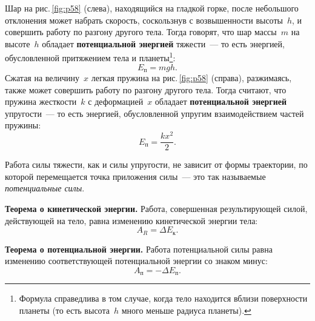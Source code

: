 \documentclass[main.tex]{subfiles}
\begin{document}
Шар на рис.\,\ref{fig:p58} (слева), находящийся на гладкой горке, после небольшого отклонения может набрать скорость, соскользнув с возвышенности высоты~$h$, и совершить работу по разгону другого тела. Тогда говорят, что шар массы~$m$ на высоте~$h$ обладает \textbf{потенциальной энергией} тяжести~--- то есть энергией, обусловленной притяжением тела и планеты\footnote{Формула справедлива в том случае, когда тело находится вблизи поверхности планеты (то есть высота~$h$ много меньше радиуса планеты).}:
\begin{equation}
    E_\text{п}=mgh.
\end{equation}
Сжатая на величину~$x$ легкая пружина на рис.\,\ref{fig:p58} (справа), разжимаясь, также может совершить работу по разгону другого тела. Тогда считают, что пружина жесткости~$k$ с деформацией~$x$ обладает \textbf{потенциальной энергией} упругости~--- то есть энергией, обусловленной упругим взаимодействием частей пружины:
\begin{equation}
    E_\text{п}=\frac{kx^2}{2}.
\end{equation}

Работа силы тяжести, как и силы упругости, не зависит от формы траектории, по которой перемещается точка приложения силы~--- это так называемые \emph{потенциальные силы}.
%
\begin{law}
\textbf{Теорема о кинетической энергии.} Работа, совершенная результирующей силой, действующей на тело, равна изменению кинетической энергии тела:
\begin{equation*}
    A_R=\Delta E_\text{к}.
\end{equation*}
\end{law}
%
\begin{law}
\textbf{Теорема о потенциальной энергии.} Работа потенциальной силы равна изменению соответствующей потенциальной энергии со знаком минус:
\begin{equation*}
    A_\text{п}=-\Delta E_\text{п}.
\end{equation*}
\end{law}
%














 
\end{document}
